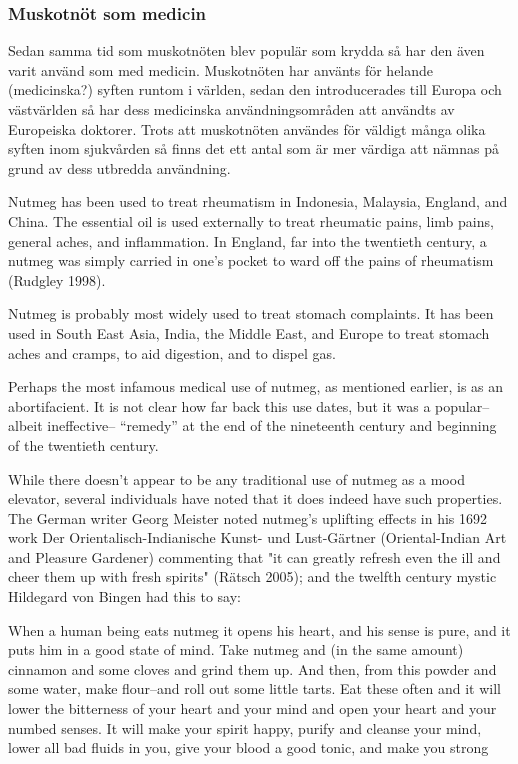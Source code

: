 \subsubsection{Muskotnöt som medicin}
Sedan samma tid som muskotnöten blev populär som krydda så har den även
varit använd som med medicin.
Muskotnöten har använts för helande (medicinska?) syften runtom i världen,
sedan den introducerades till Europa och västvärlden så har
dess medicinska användningsområden att användts av Europeiska doktorer.
Trots att muskotnöten användes för väldigt många olika syften inom sjukvården
så finns det ett antal som är mer
värdiga att nämnas på grund av dess utbredda användning.

Nutmeg has been used to treat rheumatism in Indonesia, Malaysia, England, and China. The
essential oil is used externally to treat rheumatic pains, limb pains, general aches, and
inflammation. In England, far into the twentieth century, a nutmeg was simply carried in one's
pocket to ward off the pains of rheumatism (Rudgley 1998).


Nutmeg is probably most widely used to treat stomach complaints. It has been used in South
East Asia, India, the Middle East, and Europe to treat stomach aches and cramps, to aid digestion, and to dispel gas.


Perhaps the most infamous medical use of nutmeg, as mentioned earlier, is as an
abortifacient. It is not clear how far back this use dates, but it was a popular--albeit ineffective-- “remedy” at the end of the nineteenth century and beginning of the twentieth century.

While there doesn't appear to be any traditional use of nutmeg as a mood elevator, several individuals have noted that it does indeed have such properties. The German writer Georg
Meister noted nutmeg's uplifting effects in his 1692 work Der Orientalisch-Indianische Kunst-
und Lust-Gärtner (Oriental-Indian Art and Pleasure Gardener) commenting that "it can greatly
refresh even the ill and cheer them up with fresh spirits" (Rätsch 2005); and the twelfth century
mystic Hildegard von Bingen had this to say:

\begin{displayquote}

When a human being eats nutmeg it opens his heart, and his sense is pure, and it
puts him in a good state of mind. Take nutmeg and (in the same amount) cinnamon
and some cloves and grind them up. And then, from this powder and some water,
make flour--and roll out some little tarts. Eat these often and it will lower the
bitterness of your heart and your mind and open your heart and your numbed
senses. It will make your spirit happy, purify and cleanse your mind, lower all bad
fluids in you, give your blood a good tonic, and make you strong \cite{ratsch2006pagan}

\end{displayquote}

